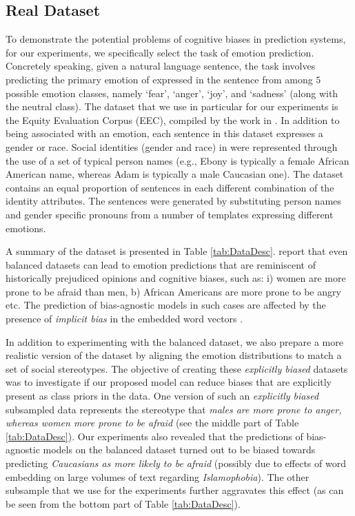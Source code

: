 \documentclass[letterpaper]{article}
\begin{document}
\subsection{Real Dataset}

To demonstrate the potential problems of cognitive biases in prediction systems, for our experiments, we specifically select the task of emotion prediction. Concretely speaking, given a natural language sentence, the task involves predicting the primary emotion of expressed in the sentence from among $5$ possible emotion classes, namely `fear', `anger', `joy', and `sadness' (along with the neutral class).
The dataset that we use in particular for our experiments is the Equity Evaluation Corpus (EEC), compiled by the work in \citep{kiritchenko-mohammad-2018-examining}. In addition to being associated with an emotion, each sentence in this dataset expresses a gender or race. Social identities (gender and race) in \citep{kiritchenko-mohammad-2018-examining} were represented through the use of a set of typical person names (e.g., Ebony is typically a female African American name, whereas Adam is typically a male Caucasian one). The dataset contains an equal proportion of sentences in each different combination of the identity attributes. The sentences were generated by substituting person names and gender specific pronouns from a number of templates expressing different emotions.

A summary of the dataset is presented in Table \ref{tab:DataDesc}.  
\citet{kiritchenko-mohammad-2018-examining} report that even balanced datasets can lead to emotion predictions that are reminiscent of historically prejudiced opinions and cognitive biases, such as: i) women are more prone to be afraid than men, b) African Americans are more prone to be angry etc. The prediction of bias-agnostic models in such cases are affected by the presence of \emph{implicit bias} in the embedded word vectors \citep{gonen-goldberg-2019}.

In addition to experimenting with the balanced dataset, we also prepare a more realistic version of the dataset by 
aligning the emotion distributions to match a set of social stereotypes. The objective of creating these \emph{explicitly biased} datasets was to investigate if our proposed model can reduce biases that are explicitly present as class priors in the data.
One version of such an \emph{explicitly biased} subsampled data represents the stereotype that \emph{males are more prone to anger, whereas women more prone to be afraid} (see the middle part of Table \ref{tab:DataDesc}). Our experiments also revealed that the predictions of bias-agnostic models on the balanced dataset turned out to be biased towards predicting \emph{Caucasians as more likely to be afraid} (possibly due to effects of word embedding on large volumes of text regarding \emph{Islamophobia}). The other subsample that we use for the experiments further aggravates this effect (as can be seen from the bottom part of Table \ref{tab:DataDesc}).
\end{document}
